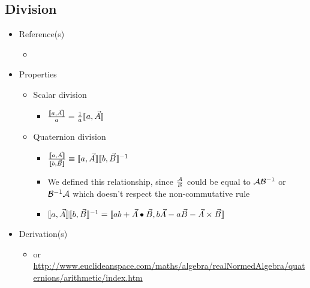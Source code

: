 \documentclass[letterpaper]{article}
\begin{document}
	\subsection{Division}
	\begin{itemize}
		\item Reference(s)
			\begin{itemize}
				\item \cite{Altmann1986}
			\end{itemize}
		\item Properties
			\begin{itemize}
				\item Scalar division
					\begin{itemize}
						\item $\frac{\llbracket a, \vec{A} \rrbracket}{a} = \frac{1}{a}\llbracket a, \vec{A} \rrbracket$
					\end{itemize}
				\item Quaternion division
					\begin{itemize}
						\item $\frac{\llbracket a, \vec{A} \rrbracket}{\llbracket b, \vec{B} \rrbracket} \equiv \llbracket a, \vec{A} \rrbracket\llbracket b, \vec{B} \rrbracket^{-1}$
						\item We defined this relationship, since $\frac{\mathcal{A}}{\mathcal{B}}$ could be equal to $\mathcal{A}\mathcal{B}^{-1}$ or $\mathcal{B}^{-1}\mathcal{A}$ which doesn't respect the non-commutative rule
						\item $\llbracket a, \vec{A} \rrbracket\llbracket b, \vec{B} \rrbracket^{-1} = \llbracket ab + \vec{A}\bullet\vec{B}, b\vec{A} - a\vec{B} - \vec{A}\times\vec{B} \rrbracket$
					\end{itemize}
			\end{itemize}
		\item Derivation(s)
			\begin{itemize}
				\item \cite{Altmann1986} or \url{http://www.euclideanspace.com/maths/algebra/realNormedAlgebra/quaternions/arithmetic/index.htm}
			\end{itemize}
	\end{itemize}
	
\end{document}
